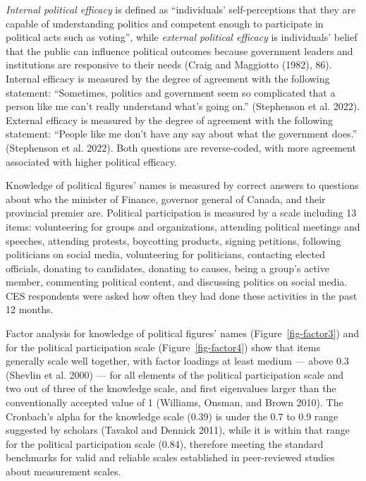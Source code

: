 \documentclass[
  letterpaper,
  DIV=11,
  numbers=noendperiod]{scrreprt}
\begin{document}
\emph{Internal political efficacy} is defined as ``individuals'
self-perceptions that they are capable of understanding politics and
competent enough to participate in political acts such as voting'',
while \emph{external political efficacy} is individuals' belief that the
public can influence political outcomes because government leaders and
institutions are responsive to their needs (Craig and Maggiotto (1982),
86). Internal efficacy is measured by the degree of agreement with the
following statement: ``Sometimes, politics and government seem so
complicated that a person like me can't really understand what's going
on.'' (Stephenson et al. 2022). External efficacy is measured by the
degree of agreement with the following statement: ``People like me don't
have any say about what the government does.'' (Stephenson et al. 2022).
Both questions are reverse-coded, with more agreement associated with
higher political efficacy.

Knowledge of political figures' names is measured by correct answers to
questions about who the minister of Finance, governor general of Canada,
and their provincial premier are. Political participation is measured by
a scale including 13 items: volunteering for groups and organizations,
attending political meetings and speeches, attending protests,
boycotting products, signing petitions, following politicians on social
media, volunteering for politicians, contacting elected officials,
donating to candidates, donating to causes, being a group's active
member, commenting political content, and discussing politics on social
media. CES respondents were asked how often they had done these
activities in the past 12 months.

Factor analysis for knowledge of political figures' names
(Figure~\ref{fig-factor3}) and for the political participation scale
(Figure~\ref{fig-factor4}) show that items generally scale well
together, with factor loadings at least medium --- above 0.3 (Shevlin et
al. 2000) --- for all elements of the political participation scale and
two out of three of the knowledge scale, and first eigenvalues larger
than the conventionally accepted value of 1 (Williams, Onsman, and Brown
2010). The Cronbach's alpha for the knowledge scale (0.39) is under the
0.7 to 0.9 range suggested by scholars (Tavakol and Dennick 2011), while
it is within that range for the political participation scale (0.84),
therefore meeting the standard benchmarks for valid and reliable scales
established in peer-reviewed studies about measurement scales.
\end{document}
